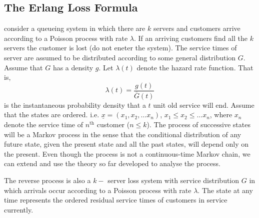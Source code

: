 \documentclass[a4paper,10pt,english]{article}
\begin{document}
\subsection{The Erlang Loss Formula}
consider a queueing system in which there are $k$ servers and customers arrive according to a Poisson process with rate $\lambda$. If an arriving customers find all the $k$ servers the customer is lost (do not eneter the system). The service times of server are assumed to be distributed according to some general distribution $G$. Assume that $G$ has a density $g$. Let $\lambda(t)$ denote the hazard rate function. That is,
\begin{equation*}
\lambda(t)=\frac{g(t)}{\bar{G}(t)}
\end{equation*}
is the instantaneous probability density that a $t$ unit old service will end. Assume that the states are ordered. i.e. $\underline{x}=(x_1,x_2, \hdots x_n)$, $x_1 \leq x_2 \leq \hdots x_n$, where $x_n$ denote the service time of $n^{\text{th}}$ customer ($n \leq k$). The process of successive states will be a Markov process in the sense that the conditional distribution of any future state, given the present state and all the past states, will depend only on the present. Even though the process is not a continuous-time Markov chain, we can extend and use the theory so far developed to analyse the process.
\begin{cor}
The reverse process is also a $k-$ server loss system with service distribution $G$ in which arrivals occur according to a Poisson process with rate $\lambda$. The state at any time represents the ordered residual service times of customers in service currently.
\end{cor}  
\end{document}
